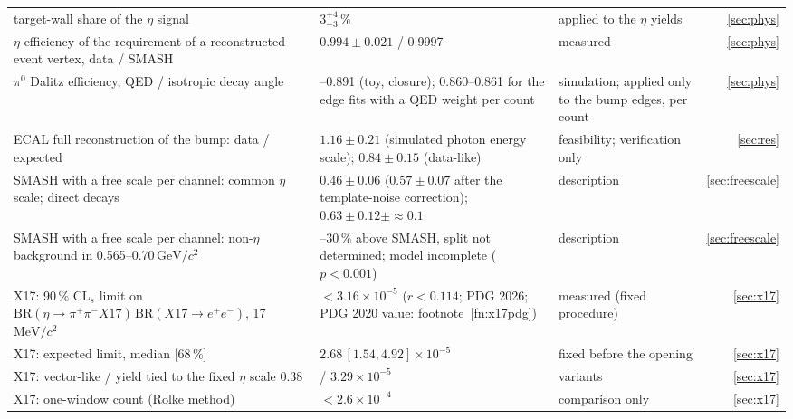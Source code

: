 \documentclass[11pt,a4paper]{article}
\newcommand{\piz}{\ensuremath{\pi^{0}}\xspace}
\newcommand{\ee}{\ensuremath{e^{+}e^{-}}\xspace}
\newcommand{\pipi}{\ensuremath{\pi^{+}\pi^{-}}\xspace}
\newcommand{\GeVcc}{\ensuremath{\mathrm{GeV}/c^{2}}\xspace}
\newcommand{\MeVcc}{\ensuremath{\mathrm{MeV}/c^{2}}\xspace}
\newcommand{\BRX}{\ensuremath{\mathrm{BR}(\eta\to\pipi X17)\,\mathrm{BR}(X17\to\ee)}\xspace}
\begin{document}
{\begin{longtable}{@{}>{\raggedright\arraybackslash}p{4.6cm} >{\raggedright\arraybackslash}p{\dimexpr\textwidth-8.3cm-6\tabcolsep\relax} >{\raggedright\arraybackslash}p{3.0cm} r@{}}
target-wall share of the $\eta$ signal & $3^{+4}_{-3}$\,\% & applied to the $\eta$ yields & \ref{sec:phys} \\
$\eta$ efficiency of the requirement of a reconstructed event vertex, data / SMASH & $0.994\pm0.021$ / 0.9997 & measured & \ref{sec:phys} \\
\piz Dalitz efficiency, QED / isotropic decay angle & 0.875--0.891 (toy, closure); 0.860--0.861 for the edge fits with a QED weight per count & simulation; applied only to the bump edges, per count & \ref{sec:phys} \\
ECAL full reconstruction of the bump: data / expected & $1.16\pm0.21$ (simulated photon energy scale); $0.84\pm0.15$ (data-like) & feasibility; verification only & \ref{sec:res} \\
SMASH with a free scale per channel: common $\eta$ scale; direct decays & $0.46\pm0.06$ ($0.57\pm0.07$ after the template-noise correction); $0.63\pm0.12\pm{\approx}0.1$ & description & \ref{sec:freescale} \\
SMASH with a free scale per channel: non-$\eta$ background in 0.565--0.70\,\GeVcc & 10--30\,\% above SMASH, split not determined; model incomplete ($p<0.001$) & description & \ref{sec:freescale} \\
X17: 90\,\% CL$_s$ limit on \BRX, 17\,\MeVcc & $<3.16\times10^{-5}$ ($r<0.114$; PDG 2026; PDG 2020 value: footnote~\ref{fn:x17pdg}) & measured (fixed procedure) & \ref{sec:x17} \\
X17: expected limit, median [68\,\%] & $2.68\,[1.54,4.92]\times10^{-5}$ & fixed before the opening & \ref{sec:x17} \\
X17: vector-like / yield tied to the fixed $\eta$ scale 0.38 & 3.79 / $3.29\times10^{-5}$ & variants & \ref{sec:x17} \\
X17: one-window count (Rolke method) & $<2.6\times10^{-4}$ & comparison only & \ref{sec:x17} \\
\end{longtable}
}

\end{document}
